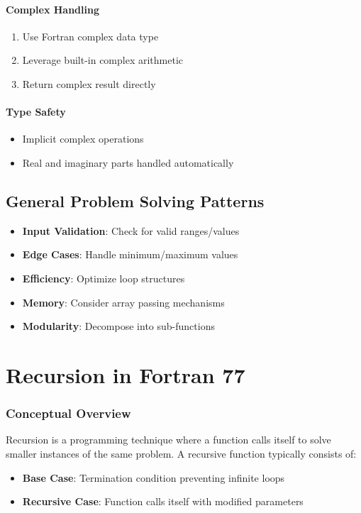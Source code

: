 \documentclass{book}
\begin{document}
\subsubsection*{Complex Handling}
\begin{enumerate}
\item Use Fortran complex data type
\item Leverage built-in complex arithmetic
\item Return complex result directly
\end{enumerate}

\subsubsection*{Type Safety}
\begin{itemize}
\item Implicit complex operations
\item Real and imaginary parts handled automatically
\end{itemize}

\section*{General Problem Solving Patterns}
\begin{itemize}
\item \textbf{Input Validation}: Check for valid ranges/values
\item \textbf{Edge Cases}: Handle minimum/maximum values
\item \textbf{Efficiency}: Optimize loop structures
\item \textbf{Memory}: Consider array passing mechanisms
\item \textbf{Modularity}: Decompose into sub-functions
\end{itemize}

\chapter{Recursion in Fortran 77}

\subsection*{Conceptual Overview}
Recursion is a programming technique where a function calls itself to solve smaller instances of the same problem. A recursive function typically consists of:
\begin{itemize}
\item \textbf{Base Case}: Termination condition preventing infinite loops
\item \textbf{Recursive Case}: Function calls itself with modified parameters
\end{itemize}
\end{document}
